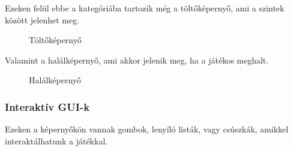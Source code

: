 Ezeken felül ebbe a kategóriába tartozik még a töltőképernyő, ami a szintek között jelenhet meg.
\begin{figure}[H]
	\noindent{}
	\caption{Töltőképernyő}
	\label{loading}
\end{figure}

\newpage
Valamint a halálképernyő, ami akkor jelenik meg, ha a játékos meghalt.
\begin{figure}[H]
	\noindent{}
	\caption{Halálképernyő}
	\label{dead}
\end{figure}

\subsubsection{Interaktív GUI-k}
Ezeken a képernyőkön vannak gombok, lenyíló listák, vagy csúszkák, amikkel interaktálhatunk a játékkal.

